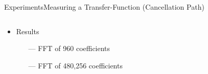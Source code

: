 \begin{frame}{Experiments}{Measuring a Transfer-Function (Cancellation Path)}		
	\begin{columns}
		\begin{column}{0.3\textwidth}
			\begin{itemize}
				\item Results
				\begin{itemize}
					\item[\textcolor{MATLABorange}{---}] FFT of 960 coefficients
					\item[\textcolor{MATLABblue}{---}] FFT of 480,256 coefficients
				\end{itemize}
			\end{itemize}
		\end{column}
		\begin{column}{0.7\textwidth} 
			\begin{figure}[h]
				
			\end{figure}
		\end{column}
	\end{columns}
\end{frame}

